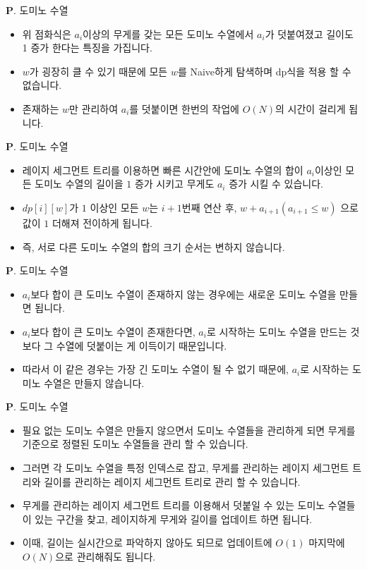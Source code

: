 \begin{frame}{\textbf{P}. 도미노 수열}
    \begin{itemize}
        \item 위 점화식은 $a_i$이상의 무게를 갖는 모든 도미노 수열에서 $a_i$가 덧붙여졌고 길이도 1 증가 한다는 특징을 가집니다.
        \item $w$가 굉장히 클 수 있기 때문에 모든 $w$를 Naive하게 탐색하며 dp식을 적용 할 수 없습니다.
        \item 존재하는 $w$만 관리하여 $a_i$를 덧붙이면 한번의 작업에 $O(N)$의 시간이 걸리게 됩니다.
    \end{itemize}
\end{frame}

\begin{frame}{\textbf{P}. 도미노 수열}
    \begin{itemize}
        \item 레이지 세그먼트 트리를 이용하면 빠른 시간안에 도미노 수열의 합이 $a_i$이상인 모든 도미노 수열의 길이을 $1$ 증가 시키고 무게도 $a_i$ 증가 시킬 수 있습니다.
        \item $dp[i][w]$가 $1$ 이상인 모든 $w$는 $i+1$번째 연산 후, $w+a_{i+1} (a_{i+1} \leq w)$ 으로 값이 $1$ 더해져 전이하게 됩니다.
        \item 즉, 서로 다른 도미노 수열의 합의 크기 순서는 변하지 않습니다.
    \end{itemize}
\end{frame}

\begin{frame}{\textbf{P}. 도미노 수열}
    \begin{itemize}
        \item $a_i$보다 합이 큰 도미노 수열이 존재하지 않는 경우에는 새로운 도미노 수열을 만들면 됩니다.
        \item $a_i$보다 합이 큰 도미노 수열이 존재한다면, $a_i$로 시작하는 도미노 수열을 만드는 것보다 그 수열에 덧붙이는 게 이득이기 때문입니다.
        \item 따라서 이 같은 경우는 가장 긴 도미노 수열이 될 수 없기 때문에, $a_i$로 시작하는 도미노 수열은 만들지 않습니다. 
    \end{itemize}
\end{frame}

\begin{frame}{\textbf{P}. 도미노 수열}
    \begin{itemize}
        \item 필요 없는 도미노 수열은 만들지 않으면서 도미노 수열들을 관리하게 되면 무게를 기준으로 정렬된 도미노 수열들을 관리 할 수 있습니다.
        \item 그러면 각 도미노 수열을 특정 인덱스로 잡고, 무게를 관리하는 레이지 세그먼트 트리와 길이를 관리하는 레이지 세그먼트 트리로 관리 할 수 있습니다.
        \item 무게를 관리하는 레이지 세그먼트 트리를 이용해서 덧붙일 수 있는 도미노 수열들이 있는 구간을 찾고, 레이지하게 무게와 길이를 업데이트 하면 됩니다.
        \item 이때, 길이는 실시간으로 파악하지 않아도 되므로 업데이트에 $O(1)$ 마지막에 $O(N)$으로 관리해줘도 됩니다.
    \end{itemize}
\end{frame}

